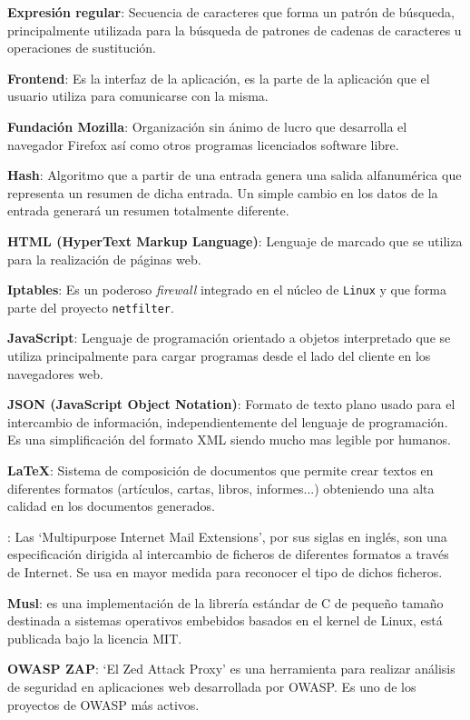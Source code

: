 \textbf{Expresión regular}: Secuencia de caracteres que forma un patrón de búsqueda, principalmente utilizada para la búsqueda de patrones de cadenas de caracteres u operaciones de sustitución.
\bigskip

\textbf{Frontend}: Es la interfaz de la aplicación, es la parte de la aplicación que el usuario utiliza para comunicarse con la misma.
\bigskip

\textbf{Fundación Mozilla}: Organización sin ánimo de lucro que desarrolla el navegador Firefox así como otros programas licenciados software libre.
\bigskip

\textbf{Hash}: Algoritmo que a partir de una entrada genera una salida alfanumérica que representa un resumen de dicha entrada. Un simple cambio en los datos de la entrada generará un resumen totalmente diferente.
\bigskip

\textbf{HTML (HyperText Markup Language)}: Lenguaje de marcado que se utiliza para la realización de páginas web.
\bigskip

\textbf{Iptables}: Es un poderoso \textit{firewall} integrado en el núcleo de \texttt{Linux} y que forma parte del proyecto \texttt{netfilter}.
\bigskip

\textbf{JavaScript}: Lenguaje de programación orientado a objetos interpretado que se utiliza principalmente para cargar programas desde el lado del cliente en los navegadores web.
\bigskip

\textbf{JSON (JavaScript Object Notation)}: Formato de texto plano usado para el intercambio de información, independientemente del lenguaje de programación. Es una simplificación del formato XML siendo mucho mas legible por humanos.
\bigskip

\textbf{LaTeX}: Sistema de composición de documentos que permite crear textos en diferentes formatos (artículos, cartas, libros, informes...) obteniendo una alta calidad en los documentos generados.
\bigskip

: Las `Multipurpose Internet Mail Extensions', por sus siglas en inglés, son una especificación dirigida al intercambio de ficheros de diferentes formatos a través de Internet. Se usa en mayor medida para reconocer el tipo de dichos ficheros.
\bigskip

\textbf{Musl}: es una implementación de la librería estándar de C de pequeño tamaño destinada a sistemas operativos embebidos basados en el kernel de Linux, está publicada bajo la licencia MIT.
\bigskip

\textbf{OWASP ZAP}: `El Zed Attack Proxy' es una herramienta para realizar análisis de seguridad en aplicaciones web desarrollada por OWASP. Es uno de los proyectos de OWASP más activos.
\bigskip

